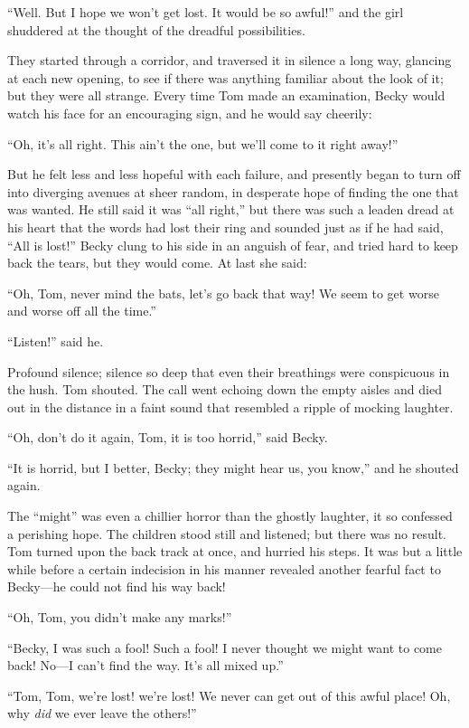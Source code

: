 \documentclass{book}
\begin{document}
“Well. But I hope we won’t get lost. It would be so awful!” and the girl shuddered at the thought of the dreadful possibilities.

They started through a corridor, and traversed it in silence a long way, glancing at each new opening, to see if there was anything familiar about the look of it; but they were all strange. Every time Tom made an examination, Becky would watch his face for an encouraging sign, and he would say cheerily:

“Oh, it’s all right. This ain’t the one, but we’ll come to it right away!”

But he felt less and less hopeful with each failure, and presently began to turn off into diverging avenues at sheer random, in desperate hope of finding the one that was wanted. He still said it was “all right,” but there was such a leaden dread at his heart that the words had lost their ring and sounded just as if he had said, “All is lost!” Becky clung to his side in an anguish of fear, and tried hard to keep back the tears, but they would come. At last she said:

“Oh, Tom, never mind the bats, let’s go back that way! We seem to get worse and worse off all the time.”

“Listen!” said he.

Profound silence; silence so deep that even their breathings were conspicuous in the hush. Tom shouted. The call went echoing down the empty aisles and died out in the distance in a faint sound that resembled a ripple of mocking laughter.

“Oh, don’t do it again, Tom, it is too horrid,” said Becky.

“It is horrid, but I better, Becky; they might hear us, you know,” and he shouted again.

The “might” was even a chillier horror than the ghostly laughter, it so confessed a perishing hope. The children stood still and listened; but there was no result. Tom turned upon the back track at once, and hurried his steps. It was but a little while before a certain indecision in his manner revealed another fearful fact to Becky—he could not find his way back!

“Oh, Tom, you didn’t make any marks!”

“Becky, I was such a fool! Such a fool! I never thought we might want to come back! No—I can’t find the way. It’s all mixed up.”

“Tom, Tom, we’re lost! we’re lost! We never can get out of this awful place! Oh, why \emph{did} we ever leave the others!”
\end{document}
